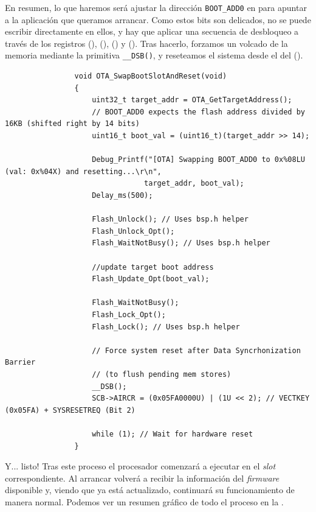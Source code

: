 \documentclass[../main.tex]{subfiles}
\begin{document}
            En resumen, lo que haremos será ajustar la dirección \texttt{BOOT\_ADD0} en  para apuntar a la aplicación que queramos arrancar. Como estos bits son delicados, no se puede escribir directamente en ellos, y hay que aplicar una secuencia de desbloqueo a través de los registros  (\REFMAN[3.7.5]),  (\REFMAN[3.7.2]),  (\REFMAN[3.7.6]) y  (\REFMAN[3.7.3]). Tras hacerlo, forzamos un volcado de la memoria mediante la primitiva \texttt{\_\_DSB()}, y reseteamos el sistema desde el  del  (\PMMAN[4.3.5]).

            \begin{lstlisting}
                void OTA_SwapBootSlotAndReset(void)
                {
                    uint32_t target_addr = OTA_GetTargetAddress();
                    // BOOT_ADD0 expects the flash address divided by 16KB (shifted right by 14 bits)
                    uint16_t boot_val = (uint16_t)(target_addr >> 14);

                    Debug_Printf("[OTA] Swapping BOOT_ADD0 to 0x%08LU (val: 0x%04X) and resetting...\r\n",
                                target_addr, boot_val);
                    Delay_ms(500);

                    Flash_Unlock(); // Uses bsp.h helper
                    Flash_Unlock_Opt();
                    Flash_WaitNotBusy(); // Uses bsp.h helper

                    //update target boot address
                    Flash_Update_Opt(boot_val);

                    Flash_WaitNotBusy();
                    Flash_Lock_Opt();
                    Flash_Lock(); // Uses bsp.h helper

                    // Force system reset after Data Syncrhonization Barrier
                    // (to flush pending mem stores)
                    __DSB();
                    SCB->AIRCR = (0x05FA0000U) | (1U << 2); // VECTKEY (0x05FA) + SYSRESETREQ (Bit 2)

                    while (1); // Wait for hardware reset
                }
            \end{lstlisting}

            Y... listo! Tras este proceso el procesador comenzará a ejecutar en el \emph{slot} correspondiente. Al arrancar volverá a recibir la información del \emph{firmware} disponible y, viendo que ya está actualizado, continuará su funcionamiento de manera normal. Podemos ver un resumen gráfico de todo el proceso en la .
\end{document}
